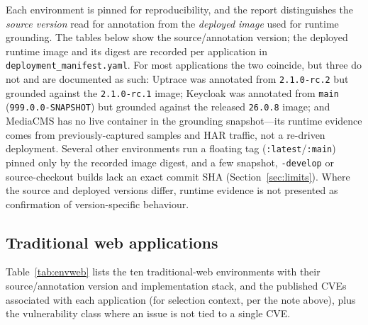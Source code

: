 \documentclass[11pt,a4paper]{article}
\newcommand{\cd}[1]{\lstinline[basicstyle=\ttfamily\small]|#1|}
\begin{document}
Each environment is pinned for reproducibility, and the report distinguishes the
\emph{source version} read for annotation from the \emph{deployed image} used for runtime
grounding. The tables below show the source/annotation version; the deployed runtime image
and its digest are recorded per application in \cd{deployment_manifest.yaml}. For most
applications the two coincide, but three do not and are documented as such: Uptrace was
annotated from \texttt{2.1.0-rc.2} but grounded against the \texttt{2.1.0-rc.1} image;
Keycloak was annotated from \texttt{main} (\texttt{999.0.0-SNAPSHOT}) but grounded against the
released \texttt{26.0.8} image; and MediaCMS has no live container in the grounding
snapshot---its runtime evidence comes from previously-captured samples and HAR traffic, not a
re-driven deployment. Several other environments run a floating tag
(\texttt{:latest}/\texttt{:main}) pinned only by the recorded image digest, and a few
snapshot, \texttt{-develop} or source-checkout builds lack an exact commit SHA
(Section~\ref{sec:limits}). Where the source and deployed versions differ, runtime evidence is
not presented as confirmation of version-specific behaviour.

\subsection{Traditional web applications}
Table~\ref{tab:envweb} lists the ten traditional-web environments with their
source/annotation version and implementation stack, and the published CVEs associated with
each application (for selection context, per the note above), plus the vulnerability class
where an issue is not tied to a single CVE.
\end{document}
